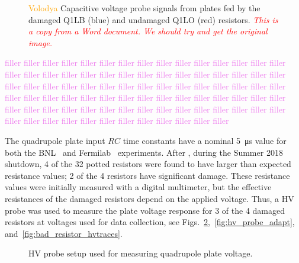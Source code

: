 \begin{figure}[]
	\centering
	\caption{\textcolor{orange}{Volodya} Capacitive voltage probe signals from plates fed by the damaged Q1LB (blue) and undamaged Q1LO (red) resistors. \textcolor{red}{\textit{This is a copy from a Word document. We should try and get the original image.}}}\label{fig:bad_resistor_signal}
\end{figure}

\textcolor{violet}{filler filler filler filler filler filler filler filler filler filler filler filler filler filler filler filler filler filler filler filler filler filler filler filler filler filler filler filler filler filler filler filler filler filler filler filler filler filler filler filler filler filler filler filler filler filler filler filler filler filler filler filler filler filler filler filler filler filler filler filler filler filler filler filler filler filler filler filler filler filler filler filler filler filler filler filler filler filler filler filler filler filler filler filler filler filler filler}

The quadrupole plate input $RC$ time constants have a nominal \SI{5}{\micro\second} value for both the BNL~\cite{Semertzidis:2003zs} and Fermilab~\cite{Crnkovic:IPAC2018-WEPAF015} experiments. After \runone, during the Summer 2018 shutdown, 4 of the 32 potted resistors were found to have larger than expected resistance values; 2 of the 4 resistors have significant damage. These resistance values were initially measured with a digital multimeter, but the effective resistances of the damaged resistors depend on the applied voltage. Thus, a HV probe was used to measure the plate voltage response for 3 of the 4 damaged resistors at voltages used for data collection, see Figs.~\ref{fig:hv_probe_setup},~\ref{fig:hv_probe_adapt}, and~\ref{fig:bad_resistor_hvtraces}.

\begin{figure}[]
	\centering
	\caption{HV probe setup used for measuring quadrupole plate voltage.}\label{fig:hv_probe_setup}
\end{figure}

